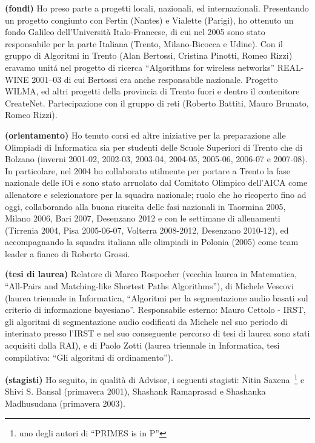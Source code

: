 \documentclass[10pt]{article}
\begin{document}
{\bf (fondi)} Ho preso parte a progetti locali, nazionali, ed internazionali.
Presentando un progetto congiunto con Fertin (Nantes) e Vialette (Parigi),
ho ottenuto un fondo Galileo dell'Universit\`a Italo-Francese,
di cui nel 2005 sono stato responsabile
per la parte Italiana (Trento, Milano-Bicocca e Udine).
Con il gruppo di Algoritmi in Trento (Alan Bertossi, Cristina Pinotti, Romeo Rizzi)
eravamo unit\'a nel progetto di ricerca ``Algorithms for wireless networks''
REAL-WINE 2001--03 di cui Bertossi era anche responsabile nazionale.
Progetto WILMA, ed altri progetti della provincia di Trento fuori e dentro il contenitore CreateNet. Partecipazione con il gruppo di reti (Roberto Battiti, Mauro Brunato, Romeo Rizzi).

{\bf (orientamento)} Ho tenuto corsi ed altre iniziative
per la preparazione alle Olimpiadi di Informatica
sia per studenti delle Scuole Superiori di Trento
che di Bolzano
(inverni 2001-02, 2002-03, 2003-04, 2004-05, 2005-06, 2006-07 e 2007-08).
In particolare, nel 2004 ho collaborato utilmente
per portare a Trento la fase nazionale delle iOi
e sono stato arruolato dal
Comitato Olimpico dell'AICA come allenatore e selezionatore
per la squadra nazionale;
ruolo che ho ricoperto fino ad oggi,
collaborando alla buona riuscita delle fasi nazionali
in Taormina 2005, Milano 2006, Bari 2007, Desenzano 2012
e con le settimane di allenamenti (Tirrenia 2004,
Pisa 2005-06-07, Volterra 2008-2012, Desenzano 2010-12),
ed accompagnando la squadra italiana alle olimpiadi
in Polonia (2005) come team leader a fianco di Roberto Grossi.

{\bf (tesi di laurea)} Relatore di Marco Rospocher
(vecchia laurea in Matematica,%
 ``All-Pairs and Matching-like Shortest Paths Algorithms''),
di Michele Vescovi
(laurea triennale in Informatica,%
 ``Algoritmi per la segmentazione audio basati
   sul criterio di informazione bayesiano''.
 Responsabile esterno: Mauro Cettolo - IRST,
gli algoritmi di segmentazione audio codificati da Michele
nel suo periodo di interinato presso l'IRST
e nel suo conseguente percorso di tesi di laurea sono stati
acquisiti dalla RAI),
e di Paolo Zotti
(laurea triennale in Informatica,
 tesi compilativa: ``Gli algoritmi di ordinamento'').

{\bf (stagisti)} Ho seguito, in qualit\`a di Advisor,
i seguenti stagisti: Nitin Saxena~\footnote{uno degli autori di ``PRIMES is in P''} e Shivi S. Bansal (primavera 2001),
Shashank Ramaprasad e Shashanka Madhusudana (primavera 2003).
\end{document}
